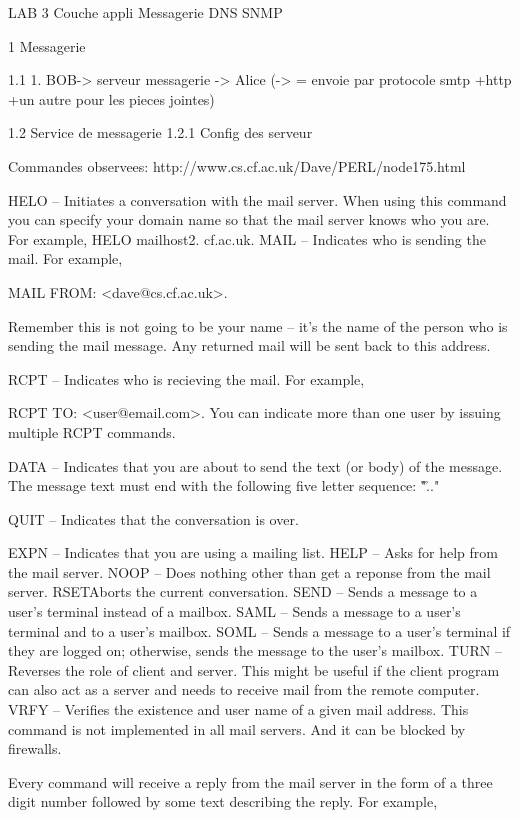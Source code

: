 LAB 3 Couche appli Messagerie DNS SNMP

1 Messagerie 

1.1 
1. BOB-> serveur messagerie -> Alice  (-> = envoie par protocole smtp +http +un autre pour les pieces jointes)


1.2 Service de messagerie 
1.2.1 Config  des serveur 

Commandes observees: http://www.cs.cf.ac.uk/Dave/PERL/node175.html


HELO
    -- Initiates a conversation with the mail server. When using this command you can specify your domain name so that the mail server knows who you are. For example, HELO mailhost2. cf.ac.uk. 
MAIL
    -- Indicates who is sending the mail. For example,

    MAIL FROM: <dave@cs.cf.ac.uk>.

    Remember this is not going to be your name -- it's the name of the person who is sending the mail message. Any returned mail will be sent back to this address.

RCPT
    -- Indicates who is recieving the mail. For example,

    RCPT TO: <user@email.com>. You can indicate more than one user by issuing multiple RCPT commands.

DATA
    -- Indicates that you are about to send the text (or body) of the message. The message text must end with the following five letter sequence: "\r\n.\r\n."

QUIT
    -- Indicates that the conversation is over.

EXPN
    -- Indicates that you are using a mailing list. 
HELP
    -- Asks for help from the mail server. 
NOOP
    -- Does nothing other than get a reponse from the mail server. RSETAborts the current conversation. 
SEND
    -- Sends a message to a user's terminal instead of a mailbox. 
SAML
    -- Sends a message to a user's terminal and to a user's mailbox. 
SOML
    -- Sends a message to a user's terminal if they are logged on; otherwise, sends the message to the user's mailbox. 
TURN
    -- Reverses the role of client and server. This might be useful if the client program can also act as a server and needs to receive mail from the remote computer. 
VRFY
    -- Verifies the existence and user name of a given mail address. This command is not implemented in all mail servers. And it can be blocked by firewalls. 

Every command will receive a reply from the mail server in the form of a three digit number followed by some text describing the reply. For example,

